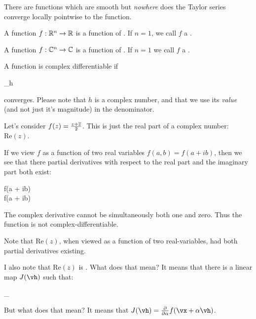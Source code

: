 \documentclass[11pt, oneside]{amsart}
\begin{document}
\begin{remark}
  There are functions which are smooth but \emph{nowhere} does the
  Taylor series converge locally pointwise to the function.
\end{remark}

\begin{definition}
  A function $f: \mathbb{R}^n \to \mathbb{R}$ is a  function of
  . If $n = 1$, we call $f$ a
  .

  A function $f: \mathbb{C}^n \to \mathbb{C}$ is a  function of
  . If $n = 1$ we call $f$ a
  .
\end{definition}

\begin{definition}
  A function is complex differentiable if

  \begin{nedqn}
    \lim_{h } 
  \end{nedqn}

  \noindent
  converges. Please note that $h$ is a complex number, and that we use
  its \emph{value} (and not just it's magnitude) in the denominator.
\end{definition}

\begin{remark}
  Let's consider $f(z) = \frac{z + \overline{z}}{2}$. This is just the real
  part of a complex number: $\text{Re}(z)$.

  If we view $f$ as a function of two real variables $f(a, b) = f(a +
  ib)$, then we see that there partial derivatives with respect to the
  real part and the imaginary part both exist:

  \begin{nedqn}
     f(a + ib)  \\
     f(a + ib) 
  \end{nedqn}

  \noindent
  The complex derivative cannot be simultaneously both one and zero.
  Thus the function is not complex-differentiable.
\end{remark}

\begin{remark}
  Note that $\text{Re}(z)$, when viewed as a function of two
  real-variables, had both partial derivatives existing.

  I also note that $\text{Re}(z)$ is . What does
  that mean? It means that there is a linear map $J(\vh)$ such that:

  \begin{nedqn}
    \lim_{\vh{}}
  \end{nedqn}

  \noindent
  But what does that mean? It means that $J(\vh) = \fpartial{\alpha}
  f(\vx + \alpha \vh)$.
\end{remark}
\end{document}
